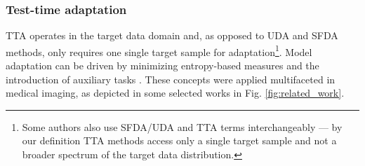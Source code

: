         \subsubsection{Test-time adaptation} %

        TTA operates in the target data domain and, as opposed to UDA and SFDA methods, only requires one single target sample for adaptation\footnote{Some authors also use SFDA/UDA and TTA terms interchangeably --- by our definition TTA methods access only a single target sample and not a broader spectrum of the target data distribution.}.
        Model adaptation can be driven by minimizing entropy-based measures \cite{wang2020tent,bateson2020source}
        and the introduction of auxiliary tasks \cite{sun2020test,karani2021test,lyu2022learning}.
        These concepts were applied multifaceted in medical imaging, as depicted in some selected works in Fig. \ref{fig:related_work}.

